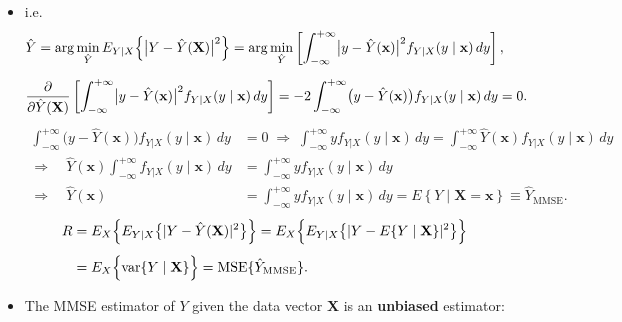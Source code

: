 \begin{itemize}
\item i.e. 
\begin{align*}
&\hat{Y}= \arg\min_{\hat{Y}} E_{Y|X}
   \Bigl\{ \bigl|Y - \hat{Y}(\mathbf{X})\bigr|^{2} \Bigr\}
   = \arg\min_{\hat{Y}}
   \left[ \int_{-\infty}^{+\infty}
      \bigl|y - \hat{Y}(\mathbf{x})\bigr|^{2}
      f_{Y|X}(y \mid \mathbf{x}) \, dy \right], \\[6pt]
&\frac{\partial}{\partial \hat{Y}(\mathbf{X})}
\left[ \int_{-\infty}^{+\infty}
   \bigl|y - \hat{Y}(\mathbf{x})\bigr|^{2}
   f_{Y|X}(y \mid \mathbf{x}) \, dy \right]
= -2 \int_{-\infty}^{+\infty}
   \bigl(y - \hat{Y}(\mathbf{x})\bigr)
   f_{Y|X}(y \mid \mathbf{x}) \, dy = 0 .
\end{align*}
\begin{align*}
\int_{-\infty}^{+\infty} \bigl(y - \hat{Y}(\mathbf{x})\bigr)
   f_{Y|X}(y \mid \mathbf{x}) \, dy &= 0
   \;\Rightarrow\;
   \int_{-\infty}^{+\infty} y f_{Y|X}(y \mid \mathbf{x}) \, dy
   = \int_{-\infty}^{+\infty} \hat{Y}(\mathbf{x})
     f_{Y|X}(y \mid \mathbf{x}) \, dy \\[4pt]
\Rightarrow\quad
\hat{Y}(\mathbf{x}) \int_{-\infty}^{+\infty} f_{Y|X}(y \mid \mathbf{x}) \, dy
&= \int_{-\infty}^{+\infty} y f_{Y|X}(y \mid \mathbf{x}) \, dy \\[4pt]
\Rightarrow\quad
\hat{Y}(\mathbf{x})
&= \int_{-\infty}^{+\infty} y f_{Y|X}(y \mid \mathbf{x}) \, dy
   = E\!\left\{ Y \mid \mathbf{X} = \mathbf{x} \right\}
   \equiv \hat{Y}_{\text{MMSE}} .
\end{align*}
\vspace{-1em}
\begin{align*}
R &= E_X \Bigl\{ E_{Y|X}
      \bigl\{ \lvert Y - \hat{Y}(\mathbf{X}) \rvert^{2} \bigr\} \Bigr\}
   = E_X \Bigl\{ E_{Y|X}
      \bigl\{ \lvert Y - E\{Y \mid \mathbf{X}\} \rvert^{2} \bigr\} \Bigr\} \\[4pt]
  &= E_X \Bigl\{ \operatorname{var}\{Y \mid \mathbf{X}\} \Bigr\}
   = \operatorname{MSE}\{\hat{Y}_{\text{MMSE}}\}.
\end{align*}
\item The MMSE estimator of \(Y\) given the data vector \textbf{X} is an \textbf{unbiased} estimator:


\end{itemize}
